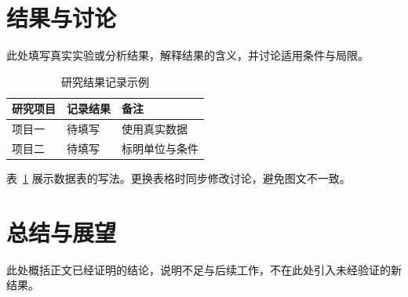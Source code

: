 
\section{结果与讨论}
\label{sec:results}
此处填写真实实验或分析结果，解释结果的含义，并讨论适用条件与局限。

\begin{table}[htbp]
  \centering
  \caption{研究结果记录示例}
  \label{tab:results}
  \begin{tabular}{lll}
    \toprule
    研究项目 & 记录结果 & 备注 \\
    \midrule
    项目一 & 待填写 & 使用真实数据 \\
    项目二 & 待填写 & 标明单位与条件 \\
    \bottomrule
  \end{tabular}
\end{table}
表~\ref{tab:results} 展示数据表的写法。更换表格时同步修改讨论，避免图文不一致。

\section{总结与展望}
此处概括正文已经证明的结论，说明不足与后续工作，不在此处引入未经验证的新结果。
